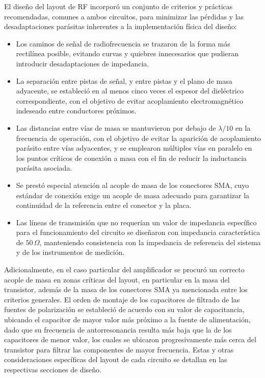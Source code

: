 El diseño del layout de RF incorporó un conjunto de criterios y prácticas recomendadas, comunes a ambos circuitos, para minimizar las pérdidas y las desadaptaciones parásitas inherentes a la implementación física del diseño:

\begin{itemize}
    \item Los caminos de señal de radiofrecuencia se trazaron de la forma más rectilínea posible, evitando curvas y quiebres innecesarios que pudieran introducir desadaptaciones de impedancia.
    \item La separación entre pistas de señal, y entre pistas y el plano de masa adyacente, se estableció en al menos cinco veces el espesor del dieléctrico correspondiente, con el objetivo de evitar acoplamiento electromagnético indeseado entre conductores próximos.
    \item Las distancias entre vías de masa se mantuvieron por debajo de $\lambda/10$ en la frecuencia de operación, con el objetivo de evitar la aparición de acoplamiento parásito entre vías adyacentes, y se emplearon múltiples vías en paralelo en los puntos críticos de conexión a masa con el fin de reducir la inductancia parásita asociada.
    \item Se prestó especial atención al acople de masa de los conectores SMA, cuyo estándar de conexión exige un acople de masa adecuado para garantizar la continuidad de la referencia entre el conector y la placa.
    \item Las líneas de transmisión que no requerían un valor de impedancia específico para el funcionamiento del circuito se diseñaron con impedancia característica de $50\,\Omega$, manteniendo consistencia con la impedancia de referencia del sistema y de los instrumentos de medición.
\end{itemize}

Adicionalmente, en el caso particular del amplificador se procuró un correcto acople de masa en zonas críticas del layout, en particular en la masa del transistor, además de la masa de los conectores SMA ya mencionada entre los criterios generales. El orden de montaje de los capacitores de filtrado de las fuentes de polarización se estableció de acuerdo con su valor de capacitancia, ubicando el capacitor de mayor valor más próximo a la fuente de alimentación, dado que su frecuencia de autorresonancia resulta más baja que la de los capacitores de menor valor, los cuales se ubicaron progresivamente más cerca del transistor para filtrar las componentes de mayor frecuencia. Estas y otras consideraciones específicas del layout de cada circuito se detallan en las respectivas secciones de diseño.

